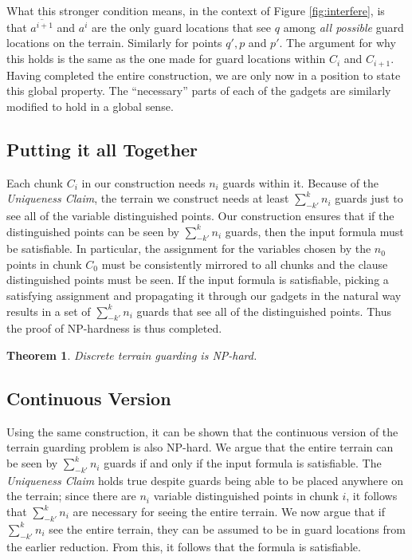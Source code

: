 \documentclass[11pt]{article}
\newtheorem{theorem}{Theorem}
\begin{document}
What this stronger condition means, in the context of Figure \ref{fig:interfere}, is that $\overline{a^{i+1}}$ and $a^i$ are the only guard locations that see $q$ among {\em all possible} guard locations on the terrain.  Similarly for points $q', p$ and $p'$.  The argument for why this holds is the same as the one made for guard locations within $C_i$ and $C_{i+1}$.  Having completed the entire construction, we are only now in a position to state this global property.  The ``necessary'' parts of each of the gadgets are similarly modified to hold in a global sense.

\subsection{Putting it all Together}
Each chunk $C_i$ in our construction needs $n_i$ guards within it.  Because of the {\em Uniqueness Claim}, the terrain we construct needs at least $\sum_{-k'}^k n_i$ guards just to see all of the variable distinguished points. Our construction ensures that if the distinguished points can be seen by $\sum_{-k'}^k n_i$ guards, then the input formula must be satisfiable. In particular, the assignment for the variables chosen by the $n_0$ points in chunk $C_0$ must be consistently mirrored to all chunks and the clause distinguished points must be seen.  If the input formula is satisfiable, picking a satisfying assignment and propagating it through our gadgets in the natural way results in a set of $\sum_{-k'}^k n_i$ guards that see all of the distinguished points. Thus the proof of NP-hardness is thus completed.

\begin{theorem}
Discrete terrain guarding is NP-hard.
\end{theorem}

\subsection{Continuous Version}
Using the same construction, it can be shown that the continuous version of the terrain guarding problem is also NP-hard.  We argue that the entire terrain can be seen by $\sum_{-k'}^k n_i$ guards if and only if the input formula is satisfiable.  The {\em Uniqueness Claim} holds true despite guards being able to be placed anywhere on the terrain; since there are $n_i$ variable distinguished points in chunk $i$, it follows that $\sum_{-k'}^k n_i$ are necessary for seeing the entire terrain.  We now argue that if $\sum_{-k'}^k n_i$ see the entire terrain, they can be assumed to be in guard locations from the earlier reduction.  From this, it follows that the formula is satisfiable.
\end{document}
